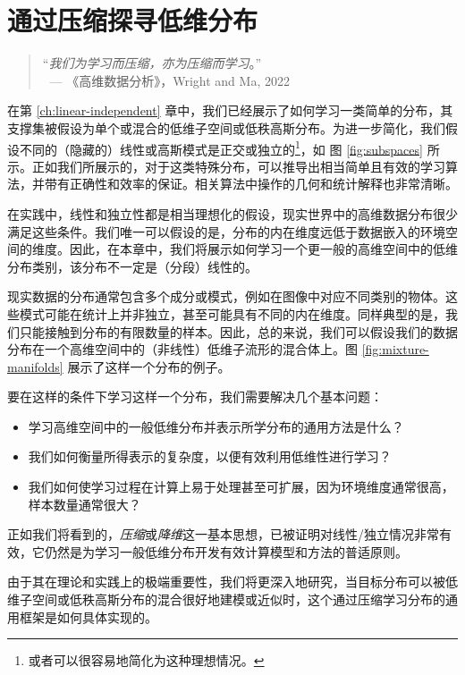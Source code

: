 \documentclass[../../book-main.tex]{subfiles}
\begin{document}
\chapter{通过压缩探寻低维分布}
\label{ch:compression}\label{ch:general-distribution}

\begin{quote}
	\hfill    “{\em 我们为学习而压缩，亦为压缩而学习}。”\\
	$~$ \hfill --- 《高维数据分析》，Wright and Ma, 2022
\end{quote}
\vspace{5mm}

在第 \ref{ch:linear-independent} 章中，我们已经展示了如何学习一类简单的分布，其支撑集被假设为单个或混合的低维子空间或低秩高斯分布。为进一步简化，我们假设不同的（隐藏的）线性或高斯模式是正交或独立的\footnote{或者可以很容易地简化为这种理想情况。}，如 图 \ref{fig:subspaces} 所示。正如我们所展示的，对于这类特殊分布，可以推导出相当简单且有效的学习算法，并带有正确性和效率的保证。相关算法中操作的几何和统计解释也非常清晰。

在实践中，线性和独立性都是相当理想化的假设，现实世界中的高维数据分布很少满足这些条件。我们唯一可以假设的是，分布的内在维度远低于数据嵌入的环境空间的维度。因此，在本章中，我们将展示如何学习一个更一般的高维空间中的低维分布类别，该分布不一定是（分段）线性的。

现实数据的分布通常包含多个成分或模式，例如在图像中对应不同类别的物体。这些模式可能在统计上并非独立，甚至可能具有不同的内在维度。同样典型的是，我们只能接触到分布的有限数量的样本。因此，总的来说，我们可以假设我们的数据分布在一个高维空间中的（非线性）低维子流形的混合体上。图 \ref{fig:mixture-manifolds} 展示了这样一个分布的例子。

要在这样的条件下学习这样一个分布，我们需要解决几个基本问题：
\begin{itemize}
	\item 学习高维空间中的一般低维分布并表示所学分布的通用方法是什么？
	\item 我们如何衡量所得表示的复杂度，以便有效利用低维性进行学习？
	\item 我们如何使学习过程在计算上易于处理甚至可扩展，因为环境维度通常很高，样本数量通常很大？
\end{itemize}
正如我们将看到的，{\em 压缩}或{\em 降维}这一基本思想，已被证明对线性/独立情况非常有效，它仍然是为学习一般低维分布开发有效计算模型和方法的普适原则。

由于其在理论和实践上的极端重要性，我们将更深入地研究，当目标分布可以被低维子空间或低秩高斯分布的混合很好地建模或近似时，这个通过压缩学习分布的通用框架是如何具体实现的。
\end{document}
